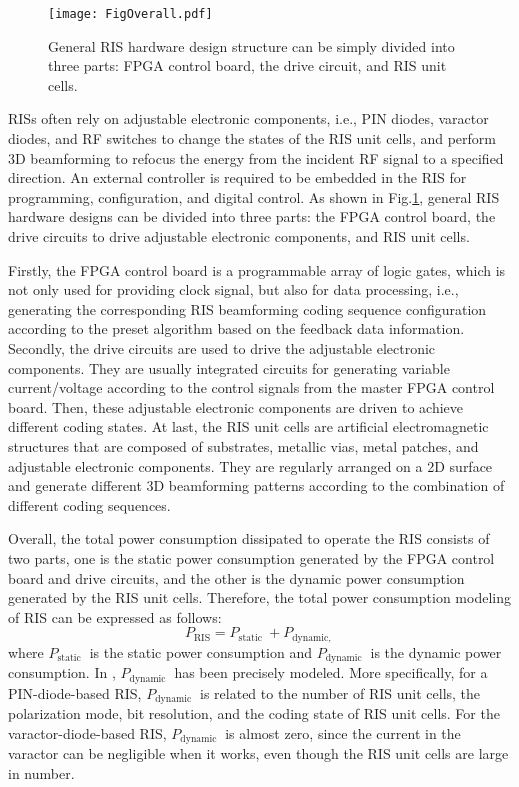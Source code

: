 \documentclass[journal]{IEEEtran}
\begin{document}
\begin{figure}
\centering
\texttt{[image: FigOverall.pdf]}
\caption{General RIS hardware design structure can be simply divided into three parts: FPGA control board, the drive circuit, and RIS unit cells.}
\label{1}
\end{figure}

RISs often rely on adjustable electronic components, i.e., PIN diodes, varactor diodes, and RF switches to change the states of the RIS unit cells, and perform 3D beamforming to refocus the energy from the incident RF signal to a specified direction. An external controller is required to be embedded in the RIS for programming, configuration, and digital control. As shown in Fig.\ref{1}, general RIS hardware designs can be divided into three parts: the FPGA control board, the drive circuits to drive adjustable electronic components, and RIS unit cells. 

Firstly, the FPGA control board is a programmable array of logic gates, which is not only used for providing clock signal, but also for data processing, i.e., generating the corresponding RIS beamforming coding sequence configuration according to the preset algorithm based on the feedback data information. Secondly, the drive circuits are used to drive the adjustable electronic components. They are usually integrated circuits for generating variable current/voltage according to the control signals from the master FPGA  control board. Then, these adjustable electronic components are driven to achieve different coding states. At last, the RIS unit cells are artificial electromagnetic structures that are composed of substrates, metallic vias, metal patches, and adjustable electronic components. They are regularly arranged on a 2D surface and generate different 3D beamforming patterns according to the combination of different coding sequences.  

Overall, the total power consumption dissipated to operate the RIS consists of two parts, one is the static power consumption generated by the FPGA control board and drive circuits, and the other is the dynamic power consumption generated by the RIS unit cells. Therefore, the total power consumption modeling of RIS can be expressed as follows:
\begin{equation}
P_{\mathrm{RIS}}=P_{\text {static }}+P_{\text {dynamic, }}
\end{equation}
where $P_{\text {static }}$ is the static power consumption and $P_{\text {dynamic }}$ is the dynamic power consumption. In \cite{wang2022reconfigurable}, $P_{\text {dynamic }}$ has been precisely modeled. More specifically, for a PIN-diode-based RIS, $P_{\text {dynamic }}$ is related to the number of RIS unit cells, the polarization mode, bit resolution, and the coding state of RIS unit cells. For the varactor-diode-based RIS, $P_{\text {dynamic }}$ is almost zero, since the current in the varactor can be negligible when it works, even though the RIS unit cells are large in number.
\end{document}

